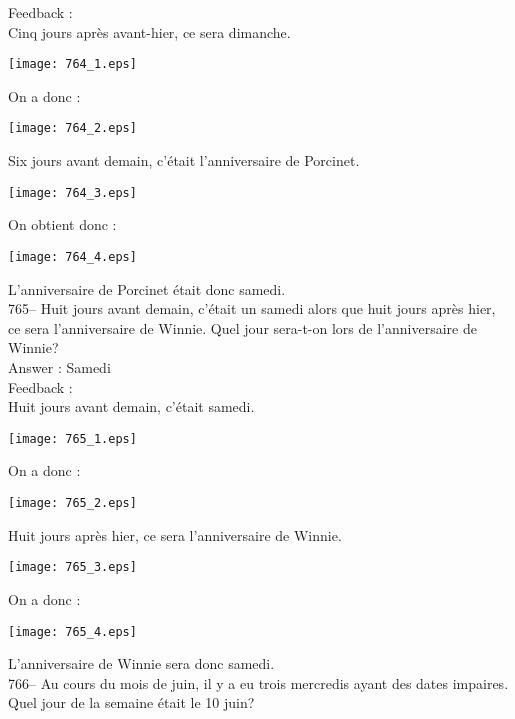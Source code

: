 ﻿\documentclass[letterpaper, 12pt]{article}
\begin{document}
Feedback : \\
Cinq jours apr\`es avant-hier, ce sera dimanche.\\
\begin{center}
\texttt{[image: 764\_1.eps]}
\end{center}
On a donc :\\
\begin{center}
\texttt{[image: 764\_2.eps]}
\end{center}
Six jours avant demain, c'\'etait l'anniversaire de Porcinet.\\
\begin{center}
\texttt{[image: 764\_3.eps]}
\end{center}
On obtient donc :
\begin{center}
\texttt{[image: 764\_4.eps]}
\end{center}
L'anniversaire de Porcinet \'etait donc samedi.\\

765-- Huit jours avant demain, c'\'etait un samedi alors que huit jours
apr\`es hier, ce sera l'anniversaire de Winnie.  Quel jour sera-t-on lors de
l'anniversaire de Winnie?\\

Answer : Samedi\\

Feedback : \\
Huit jours avant demain, c'\'etait samedi.\\
\begin{center}
\texttt{[image: 765\_1.eps]}
\end{center}
On a donc :\\\begin{center}
\texttt{[image: 765\_2.eps]}
\end{center}
Huit jours apr\`es hier, ce sera l'anniversaire de Winnie.\\
\begin{center}
\texttt{[image: 765\_3.eps]}
\end{center}
On a donc :\\
\begin{center}
\texttt{[image: 765\_4.eps]}
\end{center}
L'anniversaire de Winnie sera donc samedi.\\

766-- Au cours du mois de juin, il y a eu trois mercredis ayant des dates
impaires.  Quel jour de la semaine \'etait le 10 juin?\\
\end{document}
